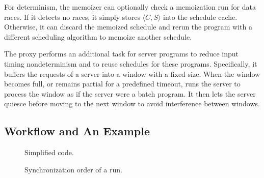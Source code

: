 For determinism, the memoizer can optionally check a memoization run for
data races.  If it detects no races, it simply stores $\langle C, S
\rangle$ into the schedule cache.  Otherwise, it can discard the memoized
schedule and rerun the program with a different scheduling algorithm to
memoize another schedule.

The proxy performs an additional task for server programs to reduce input
timing nondeterminism and to reuse schedules for these programs.
Specifically, it buffers the requests of a server into a window with
a fixed size.
When the window becomes full, or remains partial for a predefined timeout,
\tern runs the server to process the window as if the server were a batch
program.  It then lets the server quiesce before moving to the next window to
avoid interference between windows.







\subsection{Workflow and An Example} \label{sec:example}

\begin{figure}[t]
\centering \tiny {}
\caption{\small Simplified \pbzip code.}
\label{fig:pbzip2}
\end{figure}

\begin{figure}[t]
\centering
\begin{minipage}[c]{.8\linewidth}
\tiny {}
\end{minipage}
\caption{\small Synchronization order of a \pbzip run.}
\label{fig:pbzip2-sync-order}
\end{figure}

